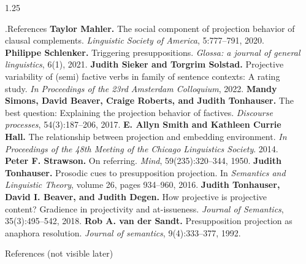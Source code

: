 \documentclass[final, table]{beamer}
\newlength{\sepwidth}
\newlength{\colwidth}
\newcommand{\separatorcolumn}{\begin{column}{\sepwidth}\end{column}}
\begin{document}
\begin{frame}[t]
\begin{columns}[t]
\begin{column}{1.25\colwidth}
\begin{normalbox}{\phantom.\hfill References}
				\textbf{Taylor Mahler.} The social component of projection behavior of clausal complements. \textit{Linguistic Society of America}, 5:777–791, 2020.\quad\textbullet\quad
				\textbf{Philippe Schlenker.} Triggering presuppositions. \textit{Glossa: a journal of general linguistics}, 6(1), 2021.\quad\textbullet\quad
				\textbf{Judith Sieker and Torgrim Solstad.} Projective variability of (semi) factive verbs in family of sentence contexts: A rating study. \textit{In Proceedings of the 23rd Amsterdam Colloquium}, 2022.\quad\textbullet\quad
				\textbf{Mandy Simons, David Beaver, Craige Roberts, and Judith Tonhauser.} The best question: Explaining the projection behavior of factives. \textit{Discourse processes}, 54(3):187–206, 2017.\quad\textbullet\quad
				\textbf{E. Allyn Smith and Kathleen Currie Hall.} The relationship between projection and embedding environment. \textit{In Proceedings of the 48th Meeting of the Chicago Linguistics Society}. 2014.\quad\textbullet\quad
				\textbf{Peter F. Strawson.} On referring. \textit{Mind}, 59(235):320–344, 1950.\quad\textbullet\quad
				\textbf{Judith Tonhauser.} Prosodic cues to presupposition projection. In \textit{Semantics and Linguistic Theory}, volume 26, pages 934–960, 2016.\quad\textbullet\quad
				\textbf{Judith Tonhauser, David I. Beaver, and Judith Degen.} How projective is projective content? Gradience in projectivity and at-issueness. \textit{Journal of Semantics}, 35(3):495–542, 2018.\quad\textbullet\quad
				\textbf{Rob A. van der Sandt.} Presupposition projection as anaphora resolution. \textit{Journal of semantics}, 9(4):333–377, 1992.

			\end{normalbox}

			\vspace{20\baselineskip}
			\begin{normalbox}{References (not visible later)}
				
				
			\end{normalbox}

		\end{column}
		\separatorcolumn
	\end{columns}



\end{frame}
\end{document}
